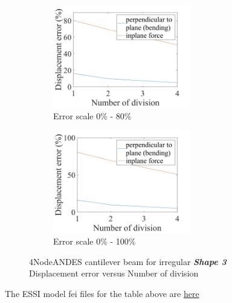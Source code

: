 \documentclass[fleqn,11pt]{article}
\begin{document}
\begin{figure}[H]
  \begin{subfigure}{0.5\textwidth}
    \centering
    \includegraphics[width=6cm]{../Figure-files/error4andes_beam_irregular_shape3.jpeg}
    \caption{Error scale 0\% - 80\%}
  \end{subfigure}
  \begin{subfigure}{0.5\textwidth}
    \centering
    \includegraphics[width=6cm]{../Figure-files/error4andes_beam_irregular_shape3100.jpeg}
    \caption{Error scale 0\% - 100\%}
  \end{subfigure}
  \captionsetup{justification=centering,margin=2cm}
  \caption{4NodeANDES cantilever beam for irregular \emph{\textbf{Shape 3}}\\
      Displacement error   versus   Number of division}
  \label{fig shape 3 4NodeANDES cantilever beam for irregular more elements}
\end{figure}


The ESSI model fei files for the table above are \href{https://github.com/yuan-energy/ESSI_Verification/blob/master/4NodeANDES/cantilever_irregular_element_cut/cantilever_irregular_element_cut.tar.gz?raw=true}{here}












\end{document}
